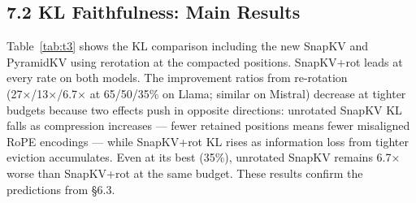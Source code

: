 \documentclass[10pt,letterpaper]{article}
\begin{document}
\hypertarget{kl-faithfulness-main-results}{%
\subsection{7.2 KL Faithfulness: Main
Results}\label{kl-faithfulness-main-results}}
Table~\ref{tab:t3} shows the KL comparison including the new SnapKV 
and PyramidKV using rerotation at the compacted positions. 
SnapKV+rot leads at every rate on both models. The improvement ratios
from re-rotation (27×/13×/6.7× at 65/50/35\% on Llama; similar on
Mistral) decrease at tighter budgets because two effects push in
opposite directions: unrotated SnapKV KL falls as compression increases
--- fewer retained positions means fewer misaligned RoPE encodings ---
while SnapKV+rot KL rises as information loss from tighter eviction
accumulates. Even at its best (35\%), unrotated SnapKV remains 6.7×
worse than SnapKV+rot at the same budget. These results confirm the
predictions from §6.3.
\end{document}
